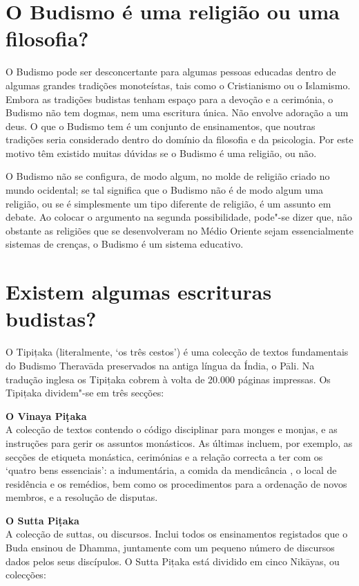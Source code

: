 \section{O Budismo é uma religião ou uma filosofia?}

O Budismo pode ser desconcertante para algumas pessoas educadas dentro
de algumas grandes tradições monoteístas, tais como o Cristianismo ou o
Islamismo. Embora as tradições budistas tenham espaço para a devoção e a
cerimónia, o Budismo não tem dogmas, nem uma escritura única. Não
envolve adoração a um deus. O que o Budismo tem é um conjunto de
ensinamentos, que noutras tradições seria considerado dentro do domínio
da filosofia e da psicologia. Por este motivo têm existido muitas
dúvidas se o Budismo é uma religião, ou não.

O Budismo não se configura, de modo algum, no molde de religião criado
no mundo ocidental; se tal significa que o Budismo não é de modo algum
uma religião, ou se é simplesmente um tipo diferente de religião, é um
assunto em debate. Ao colocar o argumento na segunda possibilidade,
pode"-se dizer que, não obstante as religiões que se desenvolveram no
Médio Oriente sejam essencialmente sistemas de crenças, o Budismo é um
sistema educativo.

\section{Existem algumas escrituras budistas?}

O Tipițaka (literalmente, `os três cestos') é uma colecção de textos
fundamentais do Budismo Theravāda preservados na antiga língua da Índia,
o Pāli. Na tradução inglesa os Tipițaka cobrem à volta de 20.000 páginas
impressas. Os Tipițaka dividem"-se em três secções:

\textbf{O Vinaya Piṭaka}\\
A colecção de textos contendo o código disciplinar para monges e monjas,
e as instruções para gerir os assuntos monásticos. As últimas incluem,
por exemplo, as secções de etiqueta monástica, cerimónias e a relação
correcta a ter com os `quatro bens essenciais': a indumentária, a
comida da mendicância , o local de residência e os remédios, bem como os
procedimentos para a ordenação de novos membros, e a resolução de
disputas.

\textbf{O Sutta Piṭaka}\\
A colecção de suttas, ou discursos. Inclui todos os ensinamentos
registados que o Buda ensinou de Dhamma, juntamente com um pequeno
número de discursos dados pelos seus discípulos. O Sutta Pițaka está
dividido em cinco Nikāyas, ou colecções:

